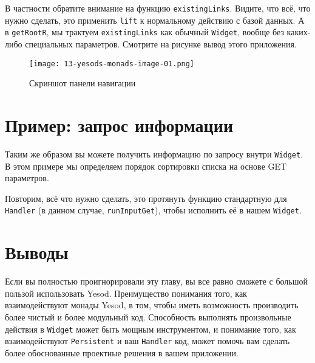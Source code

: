 

В частности обратите внимание на функцию \lstinline'existingLinks'. Видите, что всё, что
нужно сделать, это применить \lstinline'lift' к нормальному действию с базой данных. А в
\lstinline'getRootR', мы трактуем \lstinline'existingLinks' как обычный
\lstinline'Widget', вообще без каких-либо специальных параметров. Смотрите на рисунке
вывод этого приложения.

\begin{figure}[tbh]
  \centering
  \caption{Скриншот панели навигации}
  \texttt{[image: 13-yesods-monads-image-01.png]}
\end{figure}

\section{Пример: запрос информации}

Таким же образом вы можете получить информацию по запросу внутри \lstinline'Widget'. В
этом примере мы определяем порядок сортировки списка на основе GET параметров.



Повторим, всё что нужно сделать, это протянуть функцию стандартную для \lstinline'Handler'
(в данном случае, \lstinline'runInputGet'), чтобы исполнить её в нашем \lstinline'Widget'.

\section{Выводы}

Если вы полностью проигнорировали эту главу, вы все равно сможете с большой пользой 
использовать Yesod. Преимущество понимания того, как взаимодействуют монады Yesod, в том,
чтобы иметь возможность производить более чистый и более модульный код. Способность
выполнять произвольные действия в \lstinline'Widget' может быть мощным инструментом, и
понимание того, как взаимодействуют \lstinline'Persistent' и ваш \lstinline'Handler' код,
может помочь вам сделать более обоснованные проектные решения в вашем приложении.
